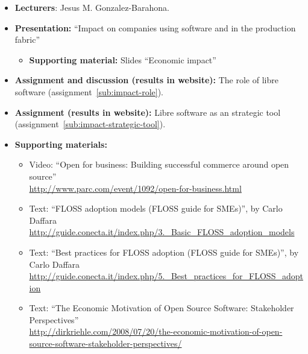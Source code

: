 \documentclass[a4paper]{article}
\begin{document}
\begin{itemize}
\item \textbf{Lecturers}: Jesus M. Gonzalez-Barahona.
\item \textbf{Presentation:} ``Impact on companies using software and in the production fabric''
  \begin{itemize}
  \item \textbf{Supporting material:} Slides ``Economic impact''
  \end{itemize}
\item \textbf{Assignment and discussion (results in website):} The role of libre software (assignment~\ref{sub:impact-role}).
\item \textbf{Assignment (results in website):} Libre software as an strategic tool  (assignment~\ref{sub:impact-strategic-tool}).
\item \textbf{Supporting materials:} 
  \begin{itemize}
  \item Video: ``Open for business: Building successful commerce around open source'' \\
    \url{http://www.parc.com/event/1092/open-for-business.html}
  \item Text: ``FLOSS adoption models (FLOSS guide for SMEs)'', by Carlo Daffara \\
    \url{http://guide.conecta.it/index.php/3._Basic_FLOSS_adoption_models}
  \item Text: ``Best practices for FLOSS adoption (FLOSS guide for SMEs)'', by Carlo Daffara \\
    \url{http://guide.conecta.it/index.php/5._Best_practices_for_FLOSS_adoption}
  \item Text: ``The Economic Motivation of Open Source Software: Stakeholder Perspectives'' \\
    \url{http://dirkriehle.com/2008/07/20/the-economic-motivation-of-open-source-software-stakeholder-perspectives/}
  \end{itemize}
  
\end{itemize}


\end{document}
